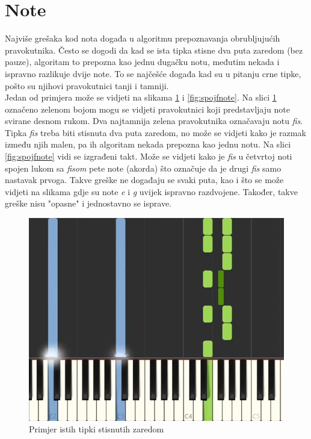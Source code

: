 \documentclass[times, utf8, zavrsni, numeric]{fer}
\begin{document}
\section{Note}
Najviše grešaka kod nota događa u algoritmu prepoznavanja obrubljujućih pravokutnika. Često se dogodi da kad se ista tipka stisne dva puta zaredom (bez pauze), algoritam to prepozna kao jednu dugačku notu, međutim nekada i ispravno razlikuje dvije note. To se najčešće događa kad su u pitanju crne tipke, pošto su njihovi pravokutnici tanji i tamniji.\\

Jedan od primjera može se vidjeti na slikama \ref{fig:spojfvideo} i \ref{fig:spojfnote}. Na slici \ref{fig:spojfvideo} označeno zelenom bojom mogu se vidjeti pravokutnici koji predstavljaju note svirane desnom rukom. Dva najtamnija zelena pravokutnika označavaju notu \textit{fis}. Tipka \textit{fis} treba biti stisnuta dva puta zaredom, no može se vidjeti kako je razmak između njih malen, pa ih algoritam nekada prepozna kao jednu notu. Na slici \ref{fig:spojfnote} vidi se izgrađeni takt. Može se vidjeti kako je \textit{fis} u četvrtoj noti spojen lukom sa \textit{fisom} pete note (akorda) što označuje da je drugi \textit{fis} samo nastavak prvoga. Takve greške ne događaju se svaki puta, kao i što se može vidjeti na slikama gdje su note \textit{e} i \textit{g} uvijek ispravno razdvojene. Također, takve greške nisu "opasne" i jednostavno se isprave.\\

\begin{figure}[h]
	\includegraphics[scale=0.4]{spojfvideo.png}
	\centering
	\caption{Primjer istih tipki stisnutih zaredom}
	\label{fig:spojfvideo}
\end{figure}
\end{document}
